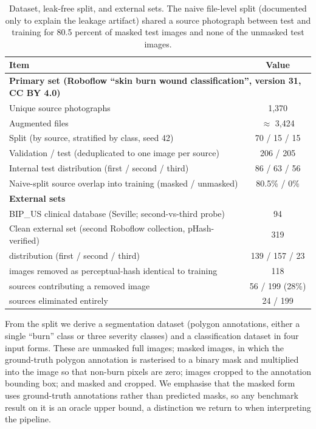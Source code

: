\documentclass{melba}
\begin{document}
\begin{table}[t]
\centering
\caption{Dataset, leak-free split, and external sets. The naive file-level split (documented only to explain the leakage artifact) shared a source photograph between test and training for 80.5 percent of masked test images and none of the unmasked test images.}
\small
\begin{tabular}{|l|c|}
\hline
Item & Value \\
\hline
\multicolumn{2}{|l|}{\textbf{Primary set (Roboflow ``skin burn wound classification'', version 31, CC BY 4.0)}} \\
\hline
Unique source photographs & 1{,}370 \\
Augmented files & $\approx$ 3{,}424 \\
Split (by source, stratified by class, seed 42) & 70 / 15 / 15 \\
Validation / test (deduplicated to one image per source) & 206 / 205 \\
Internal test distribution (first / second / third) & 86 / 63 / 56 \\
Naive-split source overlap into training (masked / unmasked) & 80.5\% / 0\% \\
\hline
\multicolumn{2}{|l|}{\textbf{External sets}} \\
\hline
BIP\_US clinical database (Seville; second-vs-third probe) & 94 \\
Clean external set (second Roboflow collection, pHash-verified) & 319 \\
\quad distribution (first / second / third) & 139 / 157 / 23 \\
\quad images removed as perceptual-hash identical to training & 118 \\
\quad sources contributing a removed image & 56 / 199 (28\%) \\
\quad sources eliminated entirely & 24 / 199 \\
\hline
\end{tabular}
\label{tab:data}
\end{table}

From the split we derive a segmentation dataset (polygon annotations, either a single ``burn'' class or three severity classes) and a classification dataset in four input forms. These are unmasked full images; masked images, in which the ground-truth polygon annotation is rasterised to a binary mask and multiplied into the image so that non-burn pixels are zero; images cropped to the annotation bounding box; and masked and cropped. We emphasise that the masked form uses ground-truth annotations rather than predicted masks, so any benchmark result on it is an oracle upper bound, a distinction we return to when interpreting the pipeline.
\end{document}
